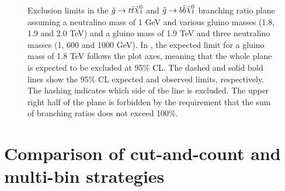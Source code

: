 \begin{figure}[htbp]
	\centering
	\caption{Exclusion limits in the $\gluino \to t \bar{t} \ninoone$ and $\gluino \to b \bar{b} \ninoone$
		branching ratio plane assuming  a neutralino mass of 1 GeV and various gluino masses 
		(1.8, 1.9 and 2.0 TeV) and  a gluino mass of 1.9 TeV and three neutralino masses (1, 600 and 1000 GeV). 
		In , the expected limit for a gluino mass of 1.8 TeV follows the plot axes, meaning that the whole plane is 
		expected to be excluded at 95\% CL.
		The dashed and solid bold lines show the 95\% CL expected and observed limits, respectively. The hashing indicates which side of the line 
		is excluded. The upper right half of the plane is forbidden by the requirement that the sum of branching ratios does not exceed 100\%.}
\end{figure}

\section{Comparison of cut-and-count and multi-bin strategies}

